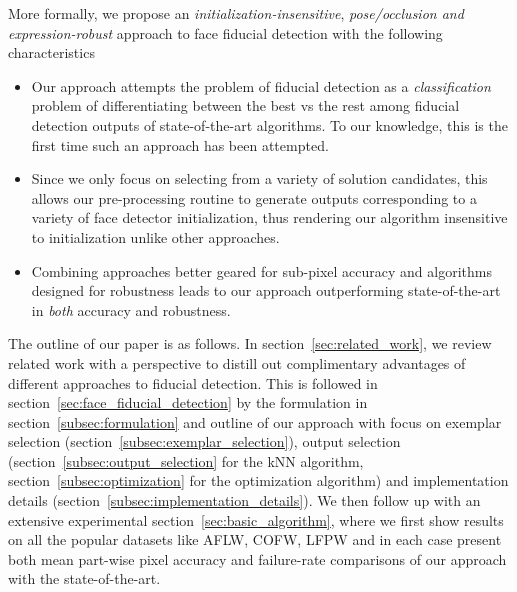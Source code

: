 More formally, we propose an \emph{initialization-insensitive}, \emph{pose/occlusion 
and expression-robust} approach to face fiducial detection with the following
characteristics
\begin{itemize}
  \item Our approach attempts the problem of fiducial detection as a \emph{classification}
    problem of differentiating between the best vs the rest among fiducial detection outputs
    of state-of-the-art algorithms. To our knowledge, this is the first time such an approach
    has been attempted.
  \item Since we only focus on selecting from a variety of solution candidates, this allows
    our pre-processing routine to generate outputs corresponding to a variety of face detector
    initialization, thus rendering our algorithm insensitive to initialization unlike
    other approaches.
  \item Combining approaches better geared for sub-pixel accuracy and algorithms designed
    for robustness leads to our approach outperforming state-of-the-art in \emph{both}
    accuracy and robustness.
\end{itemize}
   

The outline of our paper is as follows. In section~\ref{sec:related_work}, we review related work
with a perspective to distill out complimentary advantages of different approaches to
fiducial detection. This is followed in section~\ref{sec:face_fiducial_detection} by the 
formulation in section~\ref{subsec:formulation} and outline 
of our approach with focus on exemplar selection (section~\ref{subsec:exemplar_selection}),
output selection (section~\ref{subsec:output_selection} for the kNN algorithm,
section~\ref{subsec:optimization} for the optimization algorithm) and implementation details
(section~\ref{subsec:implementation_details}). We then follow up with an extensive
experimental section~\ref{sec:basic_algorithm}, 
where we first show results on
all the popular datasets like AFLW, COFW, LFPW and in each case
present both mean part-wise pixel accuracy and failure-rate comparisons of our 
approach with the state-of-the-art.
